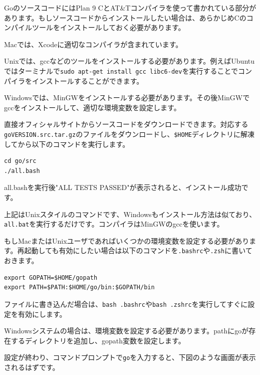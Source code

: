 GoのソースコードにはPlan 9 CとAT\&Tコンパイラを使って書かれている部分があります。もしソースコードからインストールしたい場合は、あらかじめCのコンパイルツールをインストールしておく必要があります。

Macでは、Xcodeに適切なコンパイラが含まれています。

Unixでは、gccなどのツールをインストールする必要があります。例えばUbuntuではターミナルで\texttt{sudo apt-get install gcc libc6-dev}を実行することでコンパイラをインストールすることができます。

Windowsでは、MinGWをインストールする必要があります。その後MinGWでgccをインストールして、適切な環境変数を設定します。

直接オフィシャルサイトからソースコードをダウンロードできます。対応する\texttt{goVERSION.src.tar.gz}のファイルをダウンロードし、\texttt{\$HOME}ディレクトリに解凍してから以下のコマンドを実行します。

\begin{lstlisting}[numbers=none]
cd go/src
./all.bash
\end{lstlisting}

all.bashを実行後"ALL TESTS PASSED"が表示されると、インストール成功です。

上記はUnixスタイルのコマンドです、Windowsもインストール方法は似ており、\texttt{all.bat}を実行するだけです。コンパイラはMinGWのgccを使います。

もしMacまたはUnixユーザであればいくつかの環境変数を設定する必要があります。再起動しても有効にしたい場合は以下のコマンドを\texttt{.bashrc}や\texttt{.zsh}に書いておきます。

\begin{lstlisting}[numbers=none]
export GOPATH=$HOME/gopath
export PATH=$PATH:$HOME/go/bin:$GOPATH/bin
\end{lstlisting}

ファイルに書き込んだ場合は、\texttt{bash .bashrc}や\texttt{bash .zshrc}を実行してすぐに設定を有効にします。

Windowsシステムの場合は、環境変数を設定する必要があります。pathにgoが存在するディレクトリを追加し、gopath変数を設定します。

設定が終わり、コマンドプロンプトで\texttt{go}を入力すると、下図のような画面が表示されるはずです。

